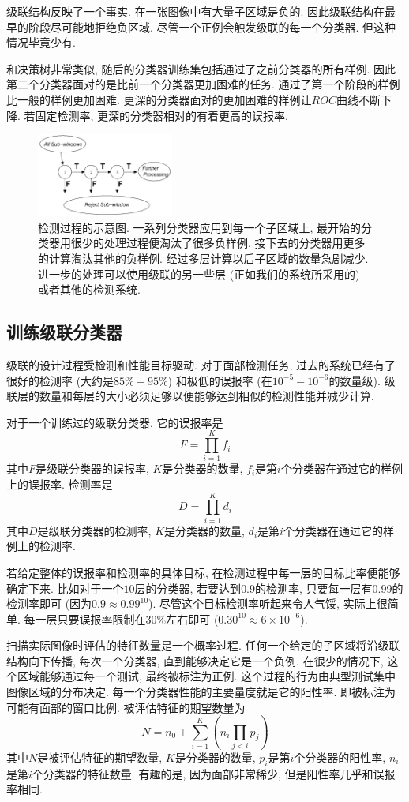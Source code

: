 \documentclass[a4paper,utf8,11pt, onecolumn]{ctexart}
\begin{document}
级联结构反映了一个事实. 在一张图像中有大量子区域是负的. 因此级联结构在最早的阶段尽可能地拒绝负区域. 尽管一个正例会触发级联的每一个分类器. 但这种情况毕竟少有.

和决策树非常类似, 随后的分类器训练集包括通过了之前分类器的所有样例. 因此第二个分类器面对的是比前一个分类器更加困难的任务. 通过了第一个阶段的样例比一般的样例更加困难. 更深的分类器面对的更加困难的样例让$ROC$曲线不断下降. 若固定检测率, 更深的分类器相对的有着更高的误报率.
\begin{figure}
\centering
\includegraphics[width=0.4\textwidth]{process.png}
\caption{检测过程的示意图. 一系列分类器应用到每一个子区域上, 最开始的分类器用很少的处理过程便淘汰了很多负样例, 接下去的分类器用更多的计算淘汰其他的负样例. 经过多层计算以后子区域的数量急剧减少. 进一步的处理可以使用级联的另一些层 (正如我们的系统所采用的) 或者其他的检测系统.}
\label{fig:process}
\end{figure}

\subsection{训练级联分类器}
级联的设计过程受检测和性能目标驱动. 对于面部检测任务, 过去的系统已经有了很好的检测率 (大约是$85\%-95\%$) 和极低的误报率 (在$10^{-5}-10^{-6}$的数量级). 级联层的数量和每层的大小必须足够以便能够达到相似的检测性能并减少计算.

对于一个训练过的级联分类器, 它的误报率是
\[
F=\prod_{i=1}^{K}f_i
\]
其中$F$是级联分类器的误报率, $K$是分类器的数量, $f_i$是第$i$个分类器在通过它的样例上的误报率. 检测率是
\[
    D=\prod_{i=1}^{K}d_i
\]
其中$D$是级联分类器的检测率, $K$是分类器的数量, $d_i$是第$i$个分类器在通过它的样例上的检测率.

若给定整体的误报率和检测率的具体目标, 在检测过程中每一层的目标比率便能够确定下来. 比如对于一个$10$层的分类器, 若要达到$0.9$的检测率, 只要每一层有$0.99$的检测率即可 (因为$0.9\approx0.99^{10}$). 尽管这个目标检测率听起来令人气馁, 实际上很简单. 每一层只要误报率限制在$30\%$左右即可 ($0.30^{10}\approx6\times10^{-6}$).

扫描实际图像时评估的特征数量是一个概率过程. 任何一个给定的子区域将沿级联结构向下传播, 每次一个分类器, 直到能够决定它是一个负例. 在很少的情况下, 这个区域能够通过每一个测试, 最终被标注为正例. 这个过程的行为由典型测试集中图像区域的分布决定. 每一个分类器性能的主要量度就是它的阳性率. 即被标注为可能有面部的窗口比例. 被评估特征的期望数量为
\[
N=n_0+\sum_{i=1}^{K}\left(n_i\prod_{j<i}p_j\right)
\]
其中$N$是被评估特征的期望数量, $K$是分类器的数量, $p_i$是第$i$个分类器的阳性率, $n_i$是第$i$个分类器的特征数量. 有趣的是, 因为面部非常稀少, 但是阳性率几乎和误报率相同.
\end{document}

